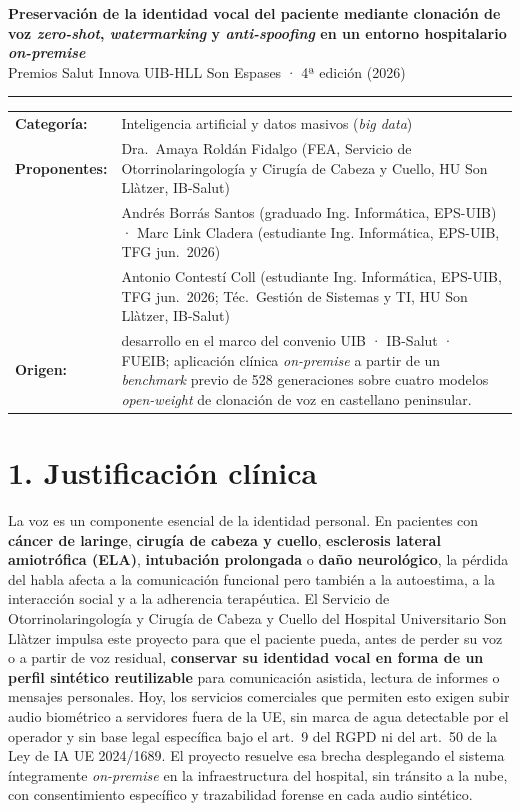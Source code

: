 \documentclass[11pt,a4paper]{article}
\begin{document}
\begin{center}
{\large\bfseries Preservación de la identidad vocal del paciente mediante clonación de voz \emph{zero-shot}, \emph{watermarking} y \emph{anti-spoofing} en un entorno hospitalario \emph{on-premise}}\\[2pt]
{\small Premios Salut Innova UIB-HLL Son Espases · 4ª edición (2026)}
\end{center}

\vspace{-4pt}
\hrule
\vspace{3pt}

\begin{tabularx}{\textwidth}{@{}lX@{}}
\textbf{Categoría:} & Inteligencia artificial y datos masivos (\emph{big data}) \\
\textbf{Proponentes:} & Dra.~Amaya Roldán Fidalgo (FEA, Servicio de Otorrinolaringología y Cirugía de Cabeza y Cuello, HU Son Llàtzer, IB-Salut) \\
& Andrés Borrás Santos (graduado Ing. Informática, EPS-UIB) · Marc Link Cladera (estudiante Ing. Informática, EPS-UIB, TFG jun.~2026) \\
& Antonio Contestí Coll (estudiante Ing. Informática, EPS-UIB, TFG jun.~2026; Téc.\ Gestión de Sistemas y TI, HU Son Llàtzer, IB-Salut) \\
\textbf{Origen:} & desarrollo en el marco del convenio UIB · IB-Salut · FUEIB; aplicación clínica \emph{on-premise} a partir de un \emph{benchmark} previo de 528 generaciones sobre cuatro modelos \emph{open-weight} de clonación de voz en castellano peninsular. \\
\end{tabularx}

\vspace{1pt}

\section*{1. Justificación clínica}

La voz es un componente esencial de la identidad personal. En pacientes con \textbf{cáncer de laringe}, \textbf{cirugía de cabeza y cuello}, \textbf{esclerosis lateral amiotrófica (ELA)}, \textbf{intubación prolongada} o \textbf{daño neurológico}, la pérdida del habla afecta a la comunicación funcional pero también a la autoestima, a la interacción social y a la adherencia terapéutica. El Servicio de Otorrinolaringología y Cirugía de Cabeza y Cuello del Hospital Universitario Son Llàtzer impulsa este proyecto para que el paciente pueda, antes de perder su voz o a partir de voz residual, \textbf{conservar su identidad vocal en forma de un perfil sintético reutilizable} para comunicación asistida, lectura de informes o mensajes personales. Hoy, los servicios comerciales que permiten esto exigen subir audio biométrico a servidores fuera de la UE, sin marca de agua detectable por el operador y sin base legal específica bajo el art.~9 del RGPD ni del art.~50 de la Ley de IA UE 2024/1689. El proyecto resuelve esa brecha desplegando el sistema íntegramente \emph{on-premise} en la infraestructura del hospital, sin tránsito a la nube, con consentimiento específico y trazabilidad forense en cada audio sintético.
\end{document}
